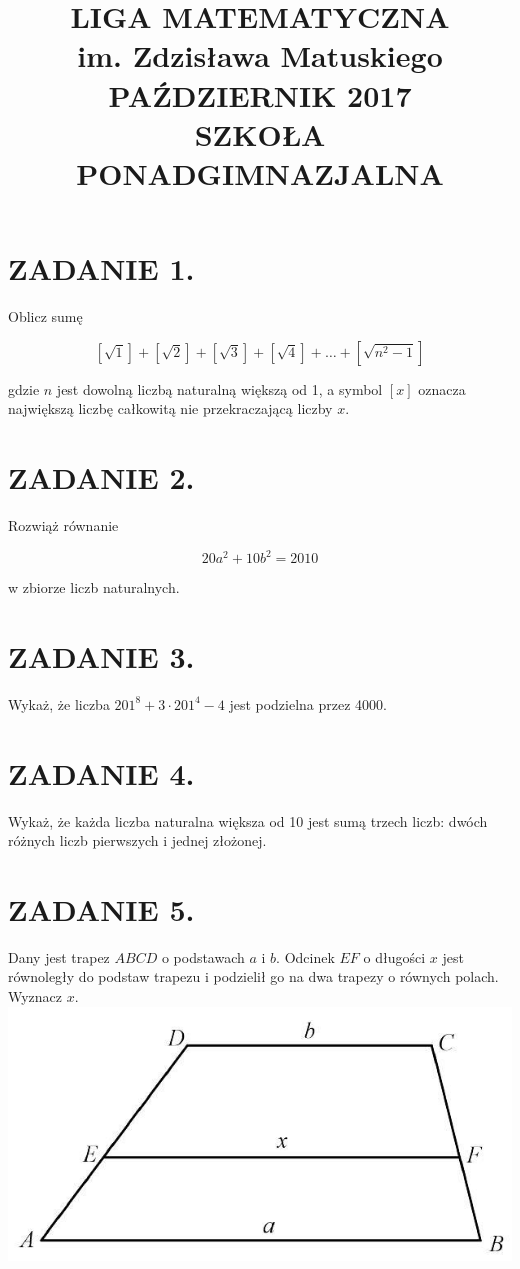 \documentclass[10pt]{article}
\title{LIGA MATEMATYCZNA \\
 im. Zdzisława Matuskiego \\
 PAŹDZIERNIK 2017 \\
 SZKOŁA PONADGIMNAZJALNA }
\author{}
\date{}
\begin{document}
\maketitle
\section*{ZADANIE 1.}
Oblicz sumę

\[
[\sqrt{1}]+[\sqrt{2}]+[\sqrt{3}]+[\sqrt{4}]+\ldots+\left[\sqrt{n^{2}-1}\right]
\]

gdzie \(n\) jest dowolną liczbą naturalną większą od 1, a symbol \([x]\) oznacza największą liczbę całkowitą nie przekraczającą liczby \(x\).

\section*{ZADANIE 2.}
Rozwiąż równanie

\[
20 a^{2}+10 b^{2}=2010
\]

w zbiorze liczb naturalnych.

\section*{ZADANIE 3.}
Wykaż, że liczba \(201^{8}+3 \cdot 201^{4}-4\) jest podzielna przez 4000.

\section*{ZADANIE 4.}
Wykaż, że każda liczba naturalna większa od 10 jest sumą trzech liczb: dwóch różnych liczb pierwszych i jednej złożonej.

\section*{ZADANIE 5.}
Dany jest trapez \(A B C D\) o podstawach \(a\) i \(b\). Odcinek \(E F\) o długości \(x\) jest równoległy do podstaw trapezu i podzielił go na dwa trapezy o równych polach. Wyznacz \(x\).\\
\includegraphics[max width=\textwidth, center]{2024_11_21_41366cd13784fcaf3560g-1}
\end{document}
